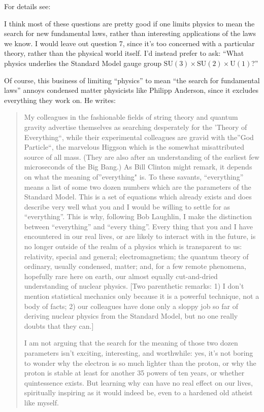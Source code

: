 \documentclass{article}
\def\tightlist{}
\renewcommand{\texttt}[1]{%
  \begingroup
  \ttfamily
  \begingroup\lccode`~=`/\lowercase{\endgroup\def~}{/\discretionary{}{}{}}%
  \begingroup\lccode`~=`[\lowercase{\endgroup\def~}{[\discretionary{}{}{}}%
  \begingroup\lccode`~=`.\lowercase{\endgroup\def~}{.\discretionary{}{}{}}%
  \catcode`/=\active\catcode`[=\active\catcode`.=\active
  \scantokens{#1\noexpand}%
  \endgroup
}
\begin{document}
For details see:


I think most of these questions are pretty good if one limits physics to
mean the search for new fundamental laws, rather than interesting
applications of the laws we know. I would leave out question 7, since
it's too concerned with a particular theory, rather than the physical
world itself. I'd instead prefer to ask: ``What physics underlies the
Standard Model gauge group
\(\mathrm{SU}(3)\times\mathrm{SU}(2)\times\mathrm{U}(1)\)?''

Of course, this business of limiting ``physics'' to mean ``the search
for fundamental laws'' annoys condensed matter physicists like Philipp
Anderson, since it excludes everything they work on. He writes:

\begin{quote}
My colleagues in the fashionable fields of string theory and quantum
gravity advertise themselves as searching desperately for the 'Theory of
Everything``, while their experimental colleagues are gravid with
the''God Particle``, the marvelous Higgson which is the somewhat
misattributed source of all mass. (They are also after an understanding
of the earliest few microseconds of the Big Bang.) As Bill Clinton might
remark, it depends on what the meaning of''everything" is. To these
savants, ``everything'' means a list of some two dozen numbers which are
the parameters of the Standard Model. This is a set of equations which
already exists and does describe very well what you and I would be
willing to settle for as ``everything''. This is why, following Bob
Laughlin, I make the distinction between ``everything'' and ``every
thing''. Every thing that you and I have encountered in our real lives,
or are likely to interact with in the future, is no longer outside of
the realm of a physics which is transparent to us: relativity, special
and general; electromagnetism; the quantum theory of ordinary, usually
condensed, matter; and, for a few remote phenomena, hopefully rare here
on earth, our almost equally cut-and-dried understanding of nuclear
physics. {[}Two parenthetic remarks: 1) I don't mention statistical
mechanics only because it is a powerful technique, not a body of facts;
2) our colleagues have done only a sloppy job so far of deriving nuclear
physics from the Standard Model, but no one really doubts that they
can.{]}

I am not arguing that the search for the meaning of those two dozen
parameters isn't exciting, interesting, and worthwhile: yes, it's not
boring to wonder why the electron is so much lighter than the proton, or
why the proton is stable at least for another 35 powers of ten years, or
whether quintessence exists. But learning why can have no real effect on
our lives, spiritually inspiring as it would indeed be, even to a
hardened old atheist like myself.
\end{quote}
\end{document}
